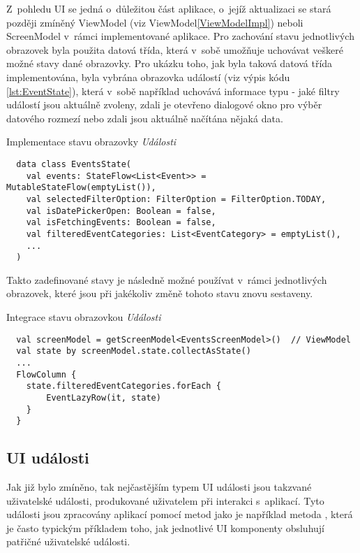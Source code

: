 Z~pohledu UI se jedná o~důležitou část aplikace, o~jejíž aktualizaci se stará později zmíněný ViewModel (viz ViewModel\ref{ViewModelImpl}) neboli ScreenModel v~rámci
implementované aplikace. 
Pro zachování stavu jednotlivých obrazovek byla použita datová třída, která v~sobě umožňuje uchovávat veškeré možné stavy dané obrazovky.
Pro ukázku toho, jak byla taková datová třída implementována, byla vybrána obrazovka událostí (viz výpis kódu \ref{lst:EventState}), která v~sobě 
například uchovává informace typu - jaké filtry událostí jsou aktuálně zvoleny, zdali je otevřeno dialogové okno pro výběr datového rozmezí 
nebo zdali jsou aktuálně načítána nějaká data.
\begin{listing}[H]
\caption{Implementace stavu obrazovky \textit{Události}}\label{lst:EventState}
\begin{verbatim}
  data class EventsState(
    val events: StateFlow<List<Event>> = MutableStateFlow(emptyList()),
    val selectedFilterOption: FilterOption = FilterOption.TODAY,
    val isDatePickerOpen: Boolean = false,
    val isFetchingEvents: Boolean = false,
    val filteredEventCategories: List<EventCategory> = emptyList(),
    ...
  )
\end{verbatim}
\end{listing}

Takto zadefinované stavy je následně možné používat v~rámci jednotlivých obrazovek, které jsou při jakékoliv změně tohoto stavu znovu sestaveny.


\begin{listing}[H]
\caption{Integrace stavu obrazovkou \textit{Události}}\label{lst:StateImpl}
\begin{verbatim}
  val screenModel = getScreenModel<EventsScreenModel>()  // ViewModel
  val state by screenModel.state.collectAsState()
  ...
  FlowColumn {
    state.filteredEventCategories.forEach {
        EventLazyRow(it, state)
    }
  }
\end{verbatim}
\end{listing}

\subsection{UI události} \label{eventHandlingImpl}

Jak již bylo zmíněno, tak nejčastějším typem UI události jsou takzvané uživatelské události, produkované uživatelem při interakci s~aplikací.
Tyto události jsou zpracovány aplikací pomocí metod jako je například metoda , která je často typickým příkladem toho, jak
jednotlivé UI komponenty obsluhují patřičné uživatelské události. 

